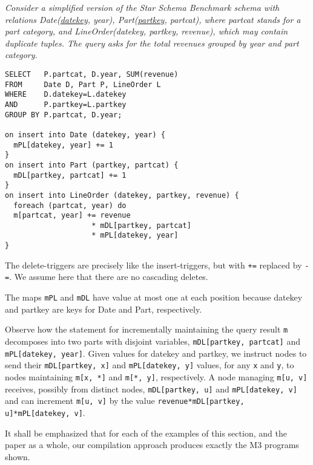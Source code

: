 \begin{example}\em
\label{ex:ssb}
Con\-sider a simplified version of the Star Schema
Benchmark schema \cite{poneil-ssb:07}
with relations Date(\underline{datekey}, year),
Part(\underline{partkey}, partcat), where partcat stands for a part category,
and LineOrder(datekey, partkey, revenue), which may contain duplicate tuples.
The query asks for the total revenues grouped by year and part category.

\begin{verbatim}
SELECT   P.partcat, D.year, SUM(revenue)
FROM     Date D, Part P, LineOrder L
WHERE    D.datekey=L.datekey
AND      P.partkey=L.partkey
GROUP BY P.partcat, D.year;

on insert into Date (datekey, year) {
  mPL[datekey, year] += 1
}
on insert into Part (partkey, partcat) {
  mDL[partkey, partcat] += 1
}
on insert into LineOrder (datekey, partkey, revenue) {
  foreach (partcat, year) do
  m[partcat, year] += revenue
                    * mDL[partkey, partcat]
                    * mPL[datekey, year]
}
\end{verbatim}
The delete-triggers are precisely
like the insert-triggers, but with {\tt +=} replaced by {\tt -=}.
We assume here that there are no cascading deletes.

The maps {\tt mPL} and {\tt mDL} have value at most
one at each position because datekey and partkey are keys for Date and Part,
respectively.

Observe how the statement for incrementally
maintaining the query result {\tt m} decomposes into
two parts with disjoint variables, 
{\tt mDL[partkey, partcat]} and {\tt mPL[datekey, year]}.
Given values for datekey and partkey, we instruct nodes
to send their {\tt mDL[partkey, x]} and {\tt mPL[datekey, y]} values,
for any {\tt x} and {\tt y},
to nodes maintaining {\tt m[x, *]} and {\tt m[*, y]}, respectively.
A node managing {\tt m[u, v]} receives, possibly from distinct nodes,
{\tt mDL[partkey, u]} and {\tt mPL[datekey, v]}
and can increment {\tt m[u, v]} by the value
{\tt revenue*mDL[partkey, u]*mPL[datekey, v]}.
%
\punto
\end{example}


It shall be emphasized that for each of the examples of this section,
and the paper as a whole, our compilation approach produces exactly
the M3 programs shown.


